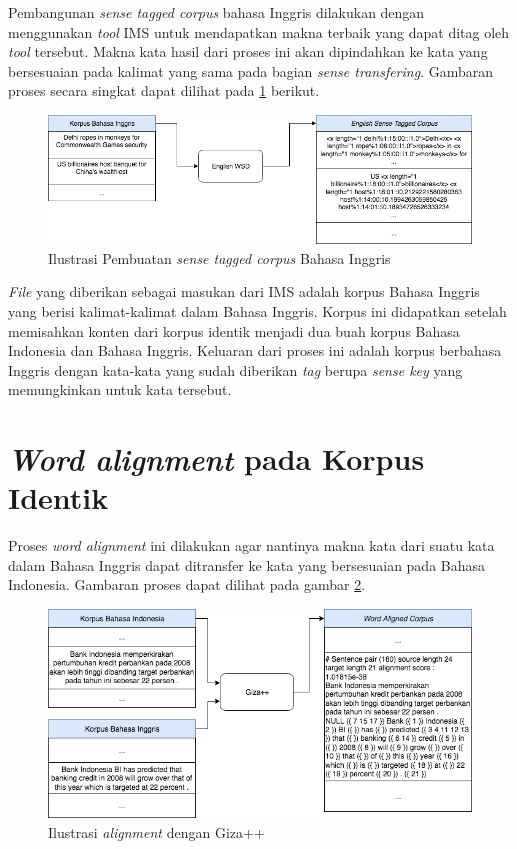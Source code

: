 Pembangunan \textit{sense tagged corpus} bahasa Inggris dilakukan dengan menggunakan \textit{tool} IMS \citep{zhong2010makes} untuk mendapatkan makna terbaik yang dapat ditag oleh \textit{tool} tersebut. Makna kata hasil dari proses ini akan dipindahkan ke kata yang bersesuaian pada kalimat yang sama pada bagian \textit{sense transfering}. Gambaran proses secara singkat dapat dilihat pada \ref{fig:producing-en-tag-corpus} berikut.


\begin{figure}
	\centering
	\includegraphics[width=1\linewidth]{adit_pics/bab-3-en-tag-corpus.png}
	\caption{Ilustrasi Pembuatan \textit{sense tagged corpus} Bahasa Inggris}
	\label{fig:producing-en-tag-corpus}
\end{figure}

\textit{File} yang diberikan sebagai masukan dari IMS adalah korpus Bahasa Inggris yang berisi kalimat-kalimat  dalam Bahasa Inggris. Korpus ini didapatkan setelah memisahkan konten dari korpus identik menjadi dua buah korpus Bahasa Indonesia dan Bahasa Inggris. Keluaran dari proses ini adalah korpus berbahasa Inggris dengan kata-kata yang sudah diberikan \textit{tag} berupa \textit{sense key} yang memungkinkan untuk kata tersebut.
\section{\textit{Word alignment} pada Korpus Identik}
Proses \textit{word alignment} ini dilakukan agar nantinya makna kata dari suatu kata dalam Bahasa Inggris dapat ditransfer ke kata yang bersesuaian pada Bahasa Indonesia. Gambaran proses dapat dilihat pada gambar \ref{fig:giza-aligning}.

\begin{figure}
	\centering
	\includegraphics[width=1\linewidth]{adit_pics/giza-process.png}
	\caption{Ilustrasi \textit{alignment} dengan Giza++}
	\label{fig:giza-aligning}
\end{figure}

